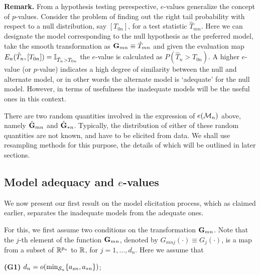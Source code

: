 \vspace{1em}
\textbf{Remark.} From a hypothesis testing perespective, $e$-values generalize the concept of $p$-values. Consider the problem of finding out the right tail probability with respect to a null distribution, say $[ T_{0n}]$, for a test statistic $\hat T_{m n}$. Here we can designate the model corresponding to the null hypothesis as the preferred model, take the smooth transformation as ${\mathbf{G}}_{m n} \equiv \hat T_{m n}$ and given the evaluation map $E_n (\hat T_n, [T_{0n}]) = {\mathbb{I}}_{ \hat T_n > T_{0n} }$ the $e$-value is calculated as $P( \hat T_n > T_{0n})$. A higher $e$-value (or $p$-value) indicates a high degree of similarity between the null and alternate model, or in other words the alternate model is `adequate' for the null model. However, in terms of usefulness the inadequate models will be the useful ones in this context.
\vspace{1em}

There are two random quantities involved in the expression of $e( {\cal{M}}_n )$ above, namely $\hat{{\mathbf{G}}}_{ m n}$ and $\hat{{\mathbf{G}}}_{ * n}$. Typically, the distribution of either of these random quantities are not known, and have to be elicited from data. We shall use resampling methods for this purpose, the details of which will be outlined in later sections.

\subsection{Model adequacy and $e$-values}
We now present our first result on the model elicitation process, which as claimed earlier, separates the inadequate models from the adequate ones.

For this, we first assume two conditions on the transformation ${\mathbf{G}}_{m n}$. Note that the $j$-th element of the function ${\mathbf{G}}_{m n}$, denoted by $G_{m n j} (\cdot) \equiv G_{j} (\cdot)$, is a map from a subset of ${\mathbb{R}}^{p_{n}}$ to ${\mathbb{R}}$, for $j = 1, \ldots, d_{n}$. Here we assume that

\vspace{1em}
\noindent\textbf{(G1)} $d_n = o( \min_{{\cal{S}}_n} \{ a_{s n}, a_{* n} \} )$;

